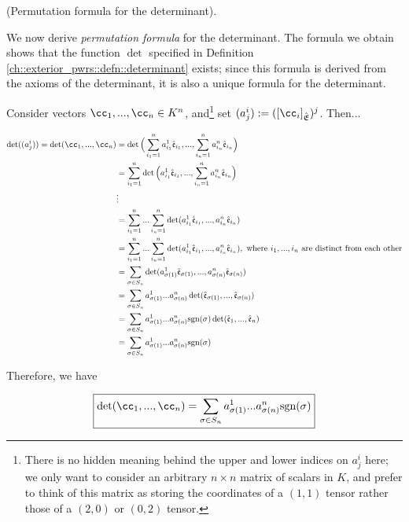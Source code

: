 \begin{deriv}
    (Permutation formula for the determinant).
    
    We now derive \textit{permutation formula} for the determinant. The formula we obtain shows that the function $\det$ specified in Definition \ref{ch::exterior_pwrs::defn::determinant} exists; since this formula is derived from the axioms of the determinant, it is also a unique formula for the determinant.
    
    Consider vectors $\cc_1, ..., \cc_n \in K^n$, and\footnote{There is no hidden meaning behind the upper and lower indices on $a^i_j$ here; we only want to consider an arbitrary $n \times n$ matrix of scalars in $K$, and prefer to think of this matrix as storing the coordinates of a $(1, 1)$ tensor rather those of a $(2, 0)$ or $(0, 2)$ tensor.} set $(a^i_j) := ([\cc_i]_\sE)^j$. Then...
    
    \begin{align*}
        \det((a^i_j)) = \det(\cc_1, ..., \cc_n)
        &= \det \Big(\sum_{i_1 = 1}^n a^1_{i_1} \see_{i_1}, ..., \sum_{i_n = 1}^n a^n_{i_n} \see_{i_n} \Big) \\
        &= \sum_{i_1 = 1}^n \det \Big( a^1_{i_1} \see_{i_1}, ..., \sum_{i_n = 1}^n a^n_{i_n} \see_{i_n} \Big) \\
        &\vdots \\
        &= \sum_{i_1 = 1}^n ... \sum_{i_n = 1}^n \det(a^1_{i_1} \see_{i_1}, ..., a^n_{i_n} \see_{i_n}) \\
        &= \sum_{i_1 = 1}^n ... \sum_{i_n = 1}^n \det(a^1_{i_1} \see_{i_1}, ..., a^n_{i_n} \see_{i_n}), \text{ where $i_1, ..., i_n$ are distinct from each other} \\
        &= \sum_{\sigma \in S_n}
        \det(a^1_{\sigma(1)} \see_{\sigma(1)}, ..., a^n_{\sigma(n)} \see_{\sigma(n)}) \\
        &= \sum_{\sigma \in S_n}
        a^1_{\sigma(1)} ... a^n_{\sigma(n)} \det(\see_{\sigma(1)}, ..., \see_{\sigma(n)}) \\
        &= \sum_{\sigma \in S_n} a^1_{\sigma(1)} ... a^n_{\sigma(n)} \text{sgn}(\sigma)
        \det(\see_1, ..., \see_n) \\
        &= \sum_{\sigma \in S_n} a^1_{\sigma(1)} ... a^n_{\sigma(n)} \text{sgn}(\sigma)
    \end{align*}
    
    Therefore, we have
    
    \begin{align*}
        \boxed
        {
            \det(\cc_1, ..., \cc_n) = \sum_{\sigma \in S_n} a^1_{\sigma(1)} ... a^n_{\sigma(n)} \sgn(\sigma)
        }
    \end{align*}
    

\end{deriv}
